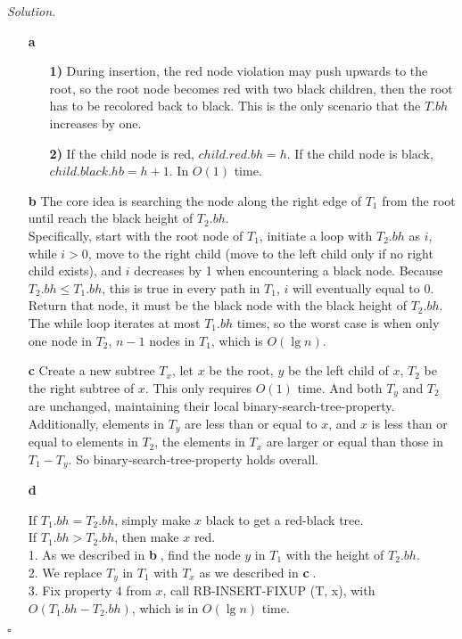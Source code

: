 \documentclass[11pt]{article}
\theoremstyle{definition}
\newenvironment{solution}{\noindent\emph{Solution.}}{\hfill$\square$}
\newcommand\tab[1][1cm]{\hspace*{#1}}
\begin{document}
\begin{solution}
\begin{enumerate}
 \item[\textbf{a}]
 \begin{enumerate}
 \item[\textbf{1)}]
  During insertion, the red node violation may push upwards to the root, so the root node becomes red with two black children, then the root has to be recolored back to black. This is the only scenario that the $T.bh$ increases by one.
 \item[\textbf{2)}]
 If the child node is red, $child.red.bh = h$. If the child node is black, $child.black.hb = h + 1$. In $O(1)$ time.
 \end{enumerate}
 
  \item[\textbf{b}]
  \tab The core idea is searching the node along the right edge of $T_1$ from the root until reach the black height of $T_2.bh$.\\
  \tab Specifically, start with the root node of $T_1$, initiate a loop with $T_2.bh$ as $i$, while $ i >0$, move to the right child (move to the left child only if no right child exists), and $i$ decreases by 1 when encountering a black node. Because $T_2.bh \leq T_1.bh$, this is true in every path in $T_1$, $ i$ will eventually equal to $0$. Return that node, it must be the black node with the black height of $T_2.bh$.\\
  \tab The while loop iterates at most $T_1.bh$ times, so the worst case is when only one node in $T_2$, $n-1$ nodes in $T_1$, which is $O( \lg n)$.
  
   \item[\textbf{c}]
   \tab Create a new subtree $T_x$, let $x$ be the root, $y$ be the left child of $x$, $T_2$ be the right subtree of $x$. This only requires $O(1)$ time. And both $T_y$ and $T_2$ are unchanged, maintaining their local binary-search-tree-property. Additionally, elements in $T_y$ are less than or equal to $x$, and $x$ is less than or equal to elements in $T_2$, the elements in $T_x$ are larger or equal than those in $T_1 - T_y$. So binary-search-tree-property holds overall.
   
   \item[\textbf{d}]

   \tab If $T_1.bh = T_2.bh$, simply make $x$ black to get a red-black tree.\\
   \tab If $T_1.bh > T_2.bh$, then make $x$ red. \\
   \tab \tab 1. As we described in \textbf{\textcircled{b}}, find the node $y$ in $T_1$ with the height of $T_2.bh$. \\
   \tab \tab 2. We replace $T_y$ in $T_1$  with $T_x$ as we described in \textbf{\textcircled{c}}. \\
   \tab \tab 3. Fix property 4 from $x$, call RB-INSERT-FIXUP (T, x), with $O(T_1.bh - T_2.bh)$, which is in $O(\lg n)$ time.
   

   
   
  \end{enumerate}
\end{solution}
\end{document}
